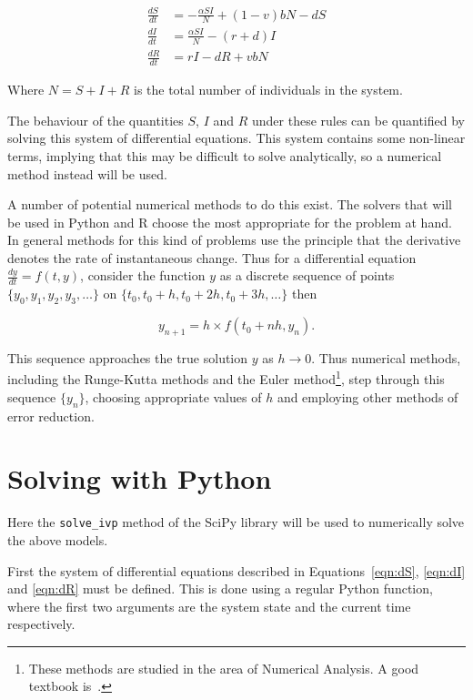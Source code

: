 \begin{align}
\frac{dS}{dt} &= -\frac{\alpha SI}{N} + (1 - v)bN - dS \label{eqn:dS}\\
\frac{dI}{dt} &= \frac{\alpha SI}{N} - (r + d)I \label{eqn:dI}\\
\frac{dR}{dt} &= rI - dR + vbN \label{eqn:dR}
\end{align}

Where $N = S + I + R$ is the total number of individuals in the system.

The behaviour of the quantities $S$, $I$ and $R$
under these rules can be quantified by solving this system of differential
equations. This system contains some non-linear terms, implying that this may be
difficult to solve analytically, so a numerical method instead will be used.

A number of potential numerical methods to do this exist.
The solvers that will be used in Python
and R choose the most appropriate for the problem at hand. In general
methods for this kind of problems use the principle that the derivative denotes
the rate of instantaneous change. Thus for a differential equation
$\frac{dy}{dt} = f(t,y)$, consider the function $y$ as a discrete sequence of
points $\{y_0, y_1, y_2, y_3, \dots\}$ on
$\{t_0, t_0 + h, t_0 + 2h, t_0 + 3h, \dots\}$ then

\begin{equation}
y_{n+1} = h \times f(t_0 + nh, y_n).
\end{equation}

This sequence approaches the true solution $y$ as $h \rightarrow 0$.
Thus numerical methods, including the Runge-Kutta methods and the Euler
method\footnote{
    These methods are studied in the area of Numerical Analysis. A good textbook
    is~\autocite{burden2001numerical}.
},
step through this sequence $\{y_n\}$, choosing appropriate values of $h$ and
employing other methods of error reduction.


\section{Solving with Python}\label{sec:solving-with-python}

Here the \texttt{solve_ivp} method of the SciPy
library will be used to numerically solve the above models.

First the system of differential equations described in Equations~\ref{eqn:dS},
\ref{eqn:dI} and \ref{eqn:dR} must be defined. This is done using a regular
Python function, where the first two arguments are the system state and the
current time respectively.

